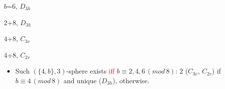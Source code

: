 \documentclass{beamer}
\begin{document}
\begin{frame}
\begin{center}
\begin{minipage}[b]{19mm}
\centering
{}\par
$b$=$6$, $D_{3h}$
\end{minipage}
\begin{minipage}[b]{19mm}
\centering
{}\par
$2$+$8$, $D_{3h}$
\end{minipage}  
\begin{minipage}[b]{19mm}
\centering
{}\par
$4$+$8$, $C_{3v}$
\end{minipage}
\begin{minipage}[b]{19mm}
\centering
{}\par
$4$+$8$, $C_{2v}$
\end{minipage}
\end{center}
\begin{itemize}
\item
Such $(\{4,b\},3)$-sphere  exists \textcolor{red}{iff} $b\equiv 2,4,6\,(mod\,8)$:
$2$ ($C_{3v}$, $C_{2v}$) if $b\equiv 4\,(mod\,8)$ and unique ($D_{3h}$),
 otherwise.
\end{itemize}

\end{frame}
\end{document}
